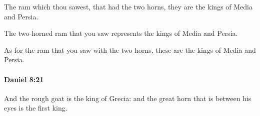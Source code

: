 			\begin{versebox}
					\item[BHS] 
					\item[LXX] 
					\item[ASV] The ram which thou sawest, that had the two horns, they are the kings of Media and Persia.
					\item[NIV] The two-horned ram that you saw represents the kings of Media and Persia.
					\item[NRSV] As for the ram that you saw with the two horns, these are the kings of Media and Persia.
			\end{versebox}

		\paragraph{Daniel 8:21} %
			\label{DANIEL-8-21}

			And the rough goat is the king of Grecia: and the great horn that is between his eyes is the first king.

